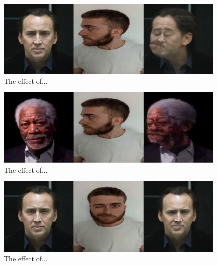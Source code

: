 \documentclass[english,12pt]{article}
\begin{document}
\begin{figure}[htb]
  \begin{centering}
      \includegraphics[scale=0.25]{images/Oren_tilt_cage.PNG}
  \par\end{centering}
  \caption{\label{fig:Oren_tilt_cage}The effect of...}
\end{figure}

\begin{figure}[htb]
  \begin{centering}
      \includegraphics[scale=0.25]{images/Oren_tilt_freeman.PNG}
  \par\end{centering}
  \caption{\label{fig:Oren_tilt_freeman}The effect of...}
\end{figure}

\begin{figure}[htb]
  \begin{centering}
      \includegraphics[scale=0.25]{images/Oren_wink_cage.PNG}
  \par\end{centering}
  \caption{\label{fig:Oren_wink_cage}The effect of...}
\end{figure}
\end{document}
